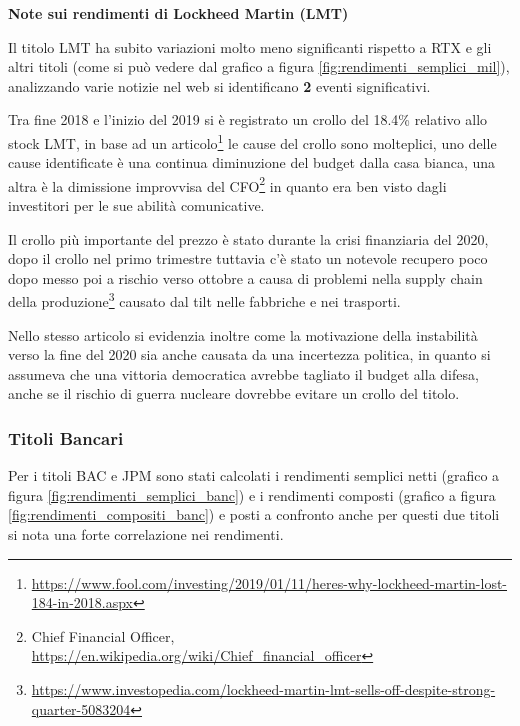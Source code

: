 \textbf{Note sui rendimenti di Lockheed Martin (LMT)}

Il titolo LMT ha subito variazioni molto meno significanti rispetto a RTX e gli altri titoli (come si può vedere dal grafico a figura \ref{fig:rendimenti_semplici_mil}), analizzando varie notizie nel web si identificano \textbf{2} eventi significativi.

Tra fine 2018 e l'inizio del 2019 si è registrato un crollo del 18.4\% relativo allo stock LMT, in base ad un 
articolo\footnote{
  \href{https://www.fool.com/investing/2019/01/11/heres-why-lockheed-martin-lost-184-in-2018.aspx}{https://www.fool.com/investing/2019/01/11/heres-why-lockheed-martin-lost-184-in-2018.aspx}
}
le cause del crollo sono molteplici, uno delle cause identificate è una continua diminuzione del budget dalla casa bianca, una altra è la dimissione improvvisa del 
CFO\footnote{
  Chief Financial Officer, \href{https://en.wikipedia.org/wiki/Chief_financial_officer}{https://en.wikipedia.org/wiki/Chief\_financial\_officer}
}
in quanto era ben visto dagli investitori per le sue abilità comunicative.

Il crollo più importante del prezzo è stato durante la crisi finanziaria del 2020, dopo il crollo nel primo trimestre tuttavia c'è stato un notevole recupero poco dopo messo poi a rischio verso ottobre a causa di problemi nella supply chain della
produzione\footnote{
  \href{https://www.investopedia.com/lockheed-martin-lmt-sells-off-despite-strong-quarter-5083204}{https://www.investopedia.com/lockheed-martin-lmt-sells-off-despite-strong-quarter-5083204}
}
causato dal tilt nelle fabbriche e nei trasporti.

Nello stesso articolo si evidenzia inoltre come la motivazione della instabilità verso la fine del 2020 sia anche causata da una incertezza politica, in quanto si assumeva che una vittoria democratica avrebbe tagliato il
budget alla difesa, anche se il rischio di guerra nucleare dovrebbe evitare un crollo del titolo.

\subsubsection{Titoli Bancari}

Per i titoli BAC e JPM sono stati calcolati i rendimenti semplici netti (grafico a figura \ref{fig:rendimenti_semplici_banc}) e i rendimenti composti (grafico a figura \ref{fig:rendimenti_compositi_banc}) e posti a confronto
anche per questi due titoli si nota una forte correlazione nei rendimenti.


